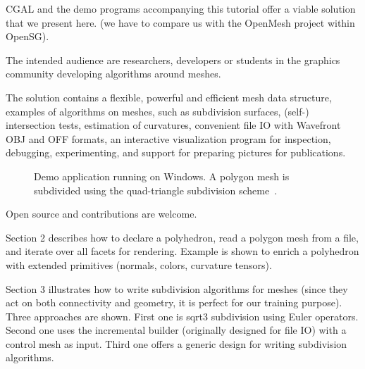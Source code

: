 CGAL and the demo programs accompanying this tutorial offer a viable
solution that we present here. (we have to compare us with the
OpenMesh project within OpenSG).


The intended audience are researchers, developers or students in the
graphics community developing algorithms around meshes.


The solution contains a flexible, powerful and efficient mesh data
structure, examples of algorithms on meshes, such as subdivision
surfaces, (self-) intersection tests, estimation of curvatures,
convenient file IO with Wavefront OBJ and OFF formats, an interactive
visualization program for inspection, debugging, experimenting, and
support for preparing pictures for publications.


\begin{figure}[htb]
    \caption{Demo application running on Windows. A polygon mesh is 
             subdivided using the quad-triangle subdivision 
             scheme~\cite{sl-qts-02}.}
    \label{fig:teaser}
\end{figure}




Open source and contributions are welcome. 




Section 2 describes how to declare a polyhedron, read a polygon mesh
from a file, and iterate over all facets for rendering. Example is
shown to enrich a polyhedron with extended primitives (normals,
colors, curvature tensors).

Section 3 illustrates how to write subdivision algorithms for meshes
(since they act on both connectivity and geometry, it is perfect for
our training purpose). Three approaches are shown. First one is sqrt3
subdivision using Euler operators. Second one uses the incremental
builder (originally designed for file IO) with a control mesh as
input. Third one offers a generic design for writing subdivision
algorithms.





